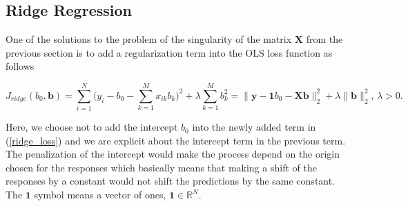 \documentclass[11pt,oneside,czech,american]{book} %
\theoremstyle{definition} %
\theoremstyle{definition}
\begin{document}

\subsection{Ridge Regression} \label{RR}
One of the solutions to the problem of the singularity of the matrix $\bm{X}$ from the previous section is to add a regularization term into the OLS loss function as follows

\begin{equation}
	J_{ridge}(b_0, \bm{b}) = \sum_{i=1}^{N} \Big(y_i - b_0 - \sum_{k=1}^{M} x_{ik} b_k \Big)^2 + \lambda \sum_{k=1}^{M} b_k^2 = \lVert \bm{y} - \bm{1} b_0 -\bm{X}\bm{b}\rVert_{2}^2 + \lambda \lVert \bm{b} \rVert^2_{2} ,\, \lambda>0.
	\label{ridge_loss}
\end{equation}

Here, we choose not to add the intercept $b_0$ into the newly added term in (\ref{ridge_loss}) and we are explicit about the intercept term in the previous term. The penalization of the intercept would make the process depend on the origin chosen for the responses which basically means that making a shift of the responses by a constant would not shift the predictions by the same constant. The $\bm{1}$ symbol means a vector of ones, $\bm{1} \in \mathbb{R}^N$.
\end{document}
